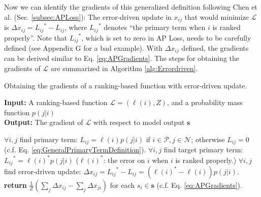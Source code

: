 \documentclass{article}
\begin{document}
Now we can identify the gradients of this generalized definition following Chen et al. (Sec. \ref{subsec:APLoss}): The error-driven update in $x_{ij}$ that would minimize $\mathcal{L}$ is $\Delta x_{ij} = {L_{ij}}^* - L_{ij}$, where ${L_{ij}}^*$ denotes ``the primary term when $i$ is ranked properly''. Note that ${L_{ij}}^*$, which is set to zero in AP Loss, needs to be carefully defined (see Appendix G for a bad example). With $\Delta x_{ij}$ defined, the gradients can be derived  similar to Eq. \eqref{eq:APGradients}. The steps for obtaining the gradients of $\mathcal{L}$ are summarized in Algorithm \ref{alg:Errordriven}.

\begin{algorithm}
\caption{Obtaining the gradients of a ranking-based function with error-driven update. \label{alg:Errordriven}}
\begin{flushleft}
\textbf{Input:} A ranking-based function $\mathcal{L} = (\ell(i), Z)$, and a probability mass function $p(j|i)$ \\ 
 \textbf{Output:} The gradient of $\mathcal{L}$ with respect to model output $\mathbf{s}$
 \end{flushleft}
\begin{algorithmic}[1]
\State $\forall i,j$ find primary term: $L_{ij} = \ell (i) p(j|i)$ if $i \in \mathcal{P}, j \in \mathcal{N}$; otherwise $L_{ij}=0$ (c.f. Eq. \eqref{eq:GeneralPrimaryTermDefinition}).
\State $\forall i,j$ find target primary term: ${L_{ij}}^*= \ell(i)^* p(j|i)$ ($\ell(i)^*$: the error on $i$ when $i$ is ranked properly.)
\State $\forall i,j$ find error-driven update: $\Delta x_{ij} = {L_{ij}}^* - L_{ij}=\left(\ell(i)^* - \ell(i)\right) p(j|i)$.
\State  \textbf{return} $\frac{1}{Z} ( \sum \limits_{j} \Delta x_{ij} - \sum \limits_{j} \Delta x_{ji} )$ for each $s_i \in \mathbf{s}$ (c.f. Eq. \eqref{eq:APGradients}).
\end{algorithmic}
\end{algorithm}
\end{document}
